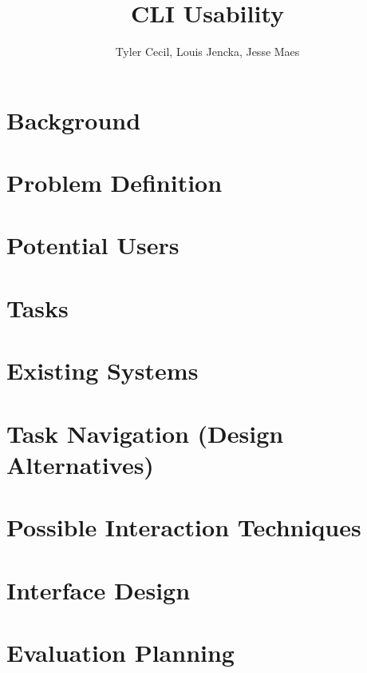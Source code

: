 \documentclass{article}
\title{CLI Usability}
\author{Tyler Cecil, Louis Jencka, Jesse Maes}
\begin{document}
\maketitle{}
\section{Background}
\label{sec:background}


\section{Problem Definition}
\label{sec:problem}


\section{Potential Users}
\label{sec:users}


\section{Tasks}
\label{sec:tasks}


\section{Existing Systems}
\label{sec:existing}


\section{Task Navigation (Design Alternatives)}
\label{sec:tas_nav}


\section{Possible Interaction Techniques}
\label{sec:interact}


\section{Interface Design}
\label{sec:interface}


\section{Evaluation Planning}
\label{sec:eval}


\end{document}
